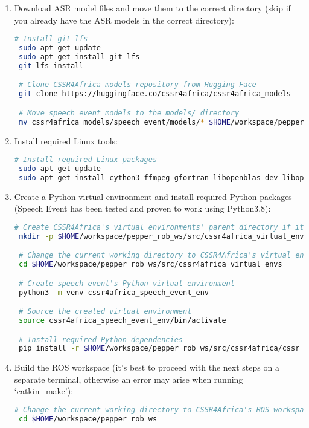 \documentclass{CSSRforAfrica}
\begin{document}
\begin{enumerate}
    \item Download ASR model files and move them to the correct directory (skip if you already have the ASR models in the correct directory):
    \begin{lstlisting}[language=bash]
 # Install git-lfs
 sudo apt-get update
 sudo apt-get install git-lfs
 git lfs install

 # Clone CSSR4Africa models repository from Hugging Face
 git clone https://huggingface.co/cssr4africa/cssr4africa_models

 # Move speech event models to the models/ directory
 mv cssr4africa_models/speech_event/models/* $HOME/workspace/pepper_rob_ws/src/cssr4africa/cssr_system/speech_event/models
    \end{lstlisting}
    \item Install required Linux tools:
    \begin{lstlisting}[language=bash]
 # Install required Linux packages
 sudo apt-get update
 sudo apt-get install cython3 ffmpeg gfortran libopenblas-dev libopenblas64-dev patchelf pkg-config portaudio19-dev python3-testresources python3-tk python3-typing-extensions sox
    \end{lstlisting}
    \item Create a Python virtual environment and install required Python packages (Speech Event has been tested and proven to work using Python3.8): 
    \begin{lstlisting}[language=bash]
 # Create CSSR4Africa's virtual environments' parent directory if it doesn't exist
 mkdir -p $HOME/workspace/pepper_rob_ws/src/cssr4africa_virtual_envs

 # Change the current working directory to CSSR4Africa's virtual environments' parent directory 
 cd $HOME/workspace/pepper_rob_ws/src/cssr4africa_virtual_envs

 # Create speech event's Python virtual environment
 python3 -m venv cssr4africa_speech_event_env

 # Source the created virtual environment
 source cssr4africa_speech_event_env/bin/activate

 # Install required Python dependencies
 pip install -r $HOME/workspace/pepper_rob_ws/src/cssr4africa/cssr_system/speech_event/speech_event_requirements.txt
    \end{lstlisting}
    \item Build the ROS workspace (it's best to proceed with the next steps on a separate terminal, otherwise an error may arise when running `catkin\_make'):
    \begin{lstlisting}[language=bash]
 # Change the current working directory to CSSR4Africa's ROS workspace
 cd $HOME/workspace/pepper_rob_ws


\end{lstlisting}
\end{enumerate}
\end{document}
